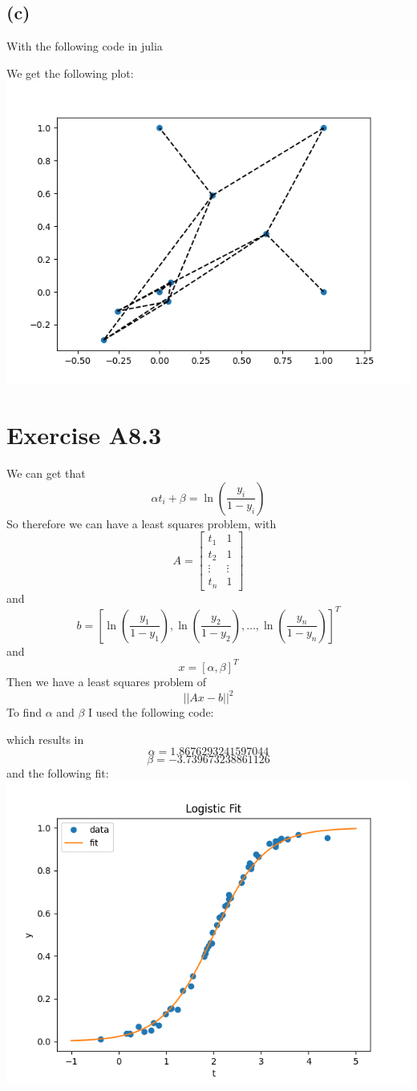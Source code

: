 \subsection*{(c)}
With the following code in julia

We get the following plot:\\
\includegraphics[scale=0.5]{fig1.png}
\section*{Exercise A8.3}
We can get that 
$$\alpha t_i+\beta=\ln(\frac{y_i}{1-y_i})$$
So therefore we can have a least squares problem, with
$$A=\begin{bmatrix}
t_1 & 1\\
t_2 & 1\\
\vdots & \vdots\\
t_n & 1
\end{bmatrix}$$
and 
$$b=[\ln(\frac{y_1}{1-y_1}),\ln(\frac{y_2}{1-y_2}),\dots,\ln(\frac{y_n}{1-y_n})]^T$$
and
$$x=[\alpha,\beta]^T$$
Then we have a least squares problem of 
$$||Ax-b||^2$$
To find $\alpha$ and $\beta$ I used the following code:

which results in
$$\alpha=1.8676293241597044$$
$$\beta=-3.739673238861126$$
and the following fit:\\  
\includegraphics[scale=0.5]{"fig2.png"}
